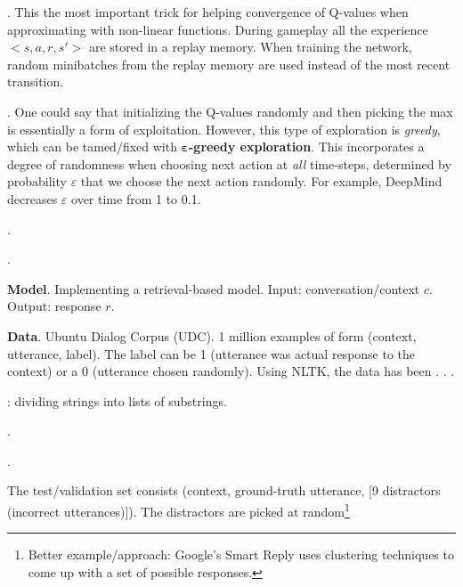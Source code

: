 \documentclass[11pt]{article}
\begin{document}
\myspace
\p {}. This the most important trick for helping convergence of Q-values when approximating with non-linear functions. During gameplay all the experience $<s, a, r, s'>$ are stored in a replay memory. When training the network, random minibatches from the replay memory are used instead of the most recent transition. 

\myspace
\p {}. One could say that initializing the Q-values randomly and then picking the max is essentially a form of exploitation. However, this type of exploration is \textit{greedy}, which can be tamed/fixed with \textbf{$\bm{\varepsilon}$-greedy exploration}. This incorporates a degree of randomness when choosing next action at \textit{all} time-steps, determined by probability $\varepsilon$ that we choose the next action randomly. For example, DeepMind decreases $\varepsilon$ over time from 1 to 0.1. 

\myspace
\p {}. 





\p {}. 
\begin{compactitem}
	\item \textbf{Model}. Implementing a retrieval-based model. Input: conversation/context $c$. Output: response $r$. 
	
	\item \textbf{Data}. Ubuntu Dialog Corpus (UDC). 1 million examples of form (context, utterance, label). The label can be 1 (utterance was actual response to the context) or a 0 (utterance chosen randomly). Using NLTK, the data has been . . . 
	\begin{compactitem}[$\rightarrow$]
		\item {}: dividing strings into lists of substrings.
		\item {}. 
		\item {}. 
	\end{compactitem}
	The test/validation set consists (context, ground-truth utterance, [9 distractors (incorrect utterances)]). The distractors are picked at random\footnote{Better example/approach: Google's Smart Reply uses clustering techniques to come up with a set of possible responses.}
\end{compactitem}
\end{document}
